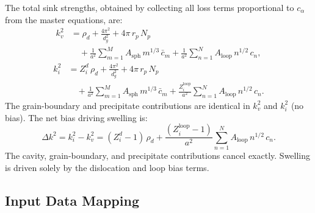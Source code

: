 The total sink strengths, obtained by collecting all loss terms proportional
to $c_\alpha$ from the master equations, are:
\begin{equation}\label{eq:kv2}
\begin{split}
  k_v^2 &= \rho_d
          + \frac{4\pi^2}{d_g^2}
          + 4\pi\,r_p\,N_p
          \\
          &\quad+ \frac{1}{a^2}\sum_{m=1}^{M}
            A_{\mathrm{sph}}\,m^{1/3}\,\bar{c}_m
          + \frac{1}{a^2}\sum_{n=1}^{N}
            A_{\mathrm{loop}}\,n^{1/2}\,c_n,
\end{split}
\end{equation}
\begin{equation}\label{eq:ki2}
\begin{split}
  k_i^2 &= Z_i^d\,\rho_d
          + \frac{4\pi^2}{d_g^2}
          + 4\pi\,r_p\,N_p
          \\
          &\quad+ \frac{1}{a^2}\sum_{m=1}^{M}
            A_{\mathrm{sph}}\,m^{1/3}\,\bar{c}_m
          + \frac{Z_i^{\mathrm{loop}}}{a^2}\sum_{n=1}^{N}
            A_{\mathrm{loop}}\,n^{1/2}\,c_n.
\end{split}
\end{equation}
The grain-boundary and precipitate contributions are identical in $k_v^2$
and $k_i^2$ (no bias). The net bias driving swelling is:
\begin{equation}\label{eq:Dk2}
    \Delta k^2 = k_i^2 - k_v^2
    = (Z_i^d - 1)\,\rho_d
    + \frac{(Z_i^{\mathrm{loop}} - 1)}{a^2}\sum_{n=1}^{N}
      A_{\mathrm{loop}}\,n^{1/2}\,c_n.
\end{equation}
The cavity, grain-boundary, and precipitate contributions cancel exactly.
Swelling is driven solely by the dislocation and loop bias terms.


\subsection{Input Data Mapping}
\label{sec:input_mapping}


